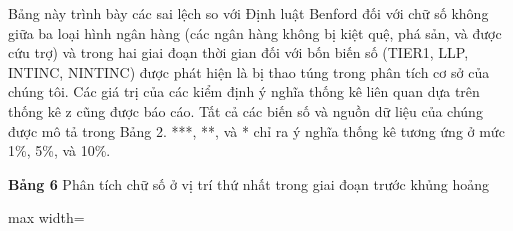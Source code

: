 Bảng này trình bày các sai lệch so với Định luật Benford đối với chữ số không giữa ba loại hình ngân hàng (các ngân hàng không bị kiệt quệ, phá sản, và được cứu trợ) và trong hai giai đoạn thời gian đối với bốn biến số (TIER1, LLP, INTINC, NINTINC) được phát hiện là bị thao túng trong phân tích cơ sở của chúng tôi. Các giá trị của các kiểm định ý nghĩa thống kê liên quan dựa trên thống kê z cũng được báo cáo. Tất cả các biến số và nguồn dữ liệu của chúng được mô tả trong Bảng 2. ***, **, và * chỉ ra ý nghĩa thống kê tương ứng ở mức 1\%, 5\%, và 10\%.

\begin{landscape}
{\small\textbf{Bảng 6} Phân tích chữ số ở vị trí thứ nhất trong giai đoạn trước khủng hoảng\par}\smallskip
\begin{center}
{\tiny\setlength{\tabcolsep}{2pt}
\begin{adjustbox}{max width=\textheight}
\begin{tabular}{lcccccccccccccccc}
\toprule

\end{tabular}
\end{adjustbox}}
\end{center}
\end{landscape}
